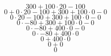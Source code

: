 $$ 300 + 100 \cdot 20 - 100 $$
$$ 0 + 0 \cdot 20 - 100 + 300 + 100 \cdot 0 - 0 $$
$$ 0 \cdot 20 - 100 + 300 + 100 \cdot 0 - 0 $$
$$ 0 \cdot -80 + 300 + 100 \cdot 0 - 0 $$
$$ 0 \cdot -80 + 400 \cdot 0 - 0 $$
$$ 0 \cdot -80 + 400 \cdot 0 $$
$$ 0 + 400 \cdot 0 $$
$$ 0 + 0 $$
$$ 0 $$
